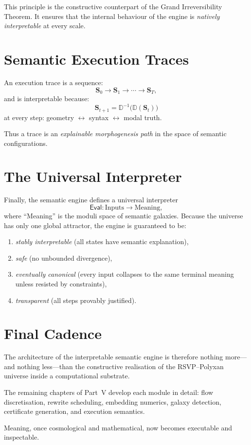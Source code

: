 This principle is the constructive counterpart of the Grand Irreversibility Theorem.
It ensures that the internal behaviour of the engine is
\emph{natively interpretable} at every scale.

\section{Semantic Execution Traces}

An execution trace is a sequence:
\[
  \mathbf{S}_0 \to \mathbf{S}_1 \to \cdots \to \mathbf{S}_T,
\]
and is interpretable because:
\[
  \mathbf{S}_{t+1}
    = \mathbb{D}^{-1}\big(\mathbb{D}(\mathbf{S}_t)\big)
\]
at every step:
geometry $\leftrightarrow$ syntax $\leftrightarrow$ modal truth.

Thus a trace is an \emph{explainable morphogenesis path} in the space
of semantic configurations.

\section{The Universal Interpreter}

Finally, the semantic engine defines a universal interpreter
\[
  \mathsf{Eval} : \text{Inputs} \to \text{Meaning},
\]
where ``Meaning'' is the moduli space of semantic galaxies.
Because the universe has only one global attractor, the engine
is guaranteed to be:
\begin{enumerate}
\item \emph{stably interpretable} (all states have semantic explanation),
\item \emph{safe} (no unbounded divergence),
\item \emph{eventually canonical} (every input collapses to the same
      terminal meaning unless resisted by constraints),
\item \emph{transparent} (all steps provably justified).
\end{enumerate}

\section{Final Cadence}

The architecture of the interpretable semantic engine is therefore
nothing more---and nothing less---than the constructive realisation
of the RSVP--Polyxan universe inside a computational substrate.

The remaining chapters of Part~V develop each module in detail:
flow discretisation, rewrite scheduling, embedding numerics,
galaxy detection, certificate generation, and execution semantics.

Meaning, once cosmological and mathematical,
now becomes executable and inspectable.

